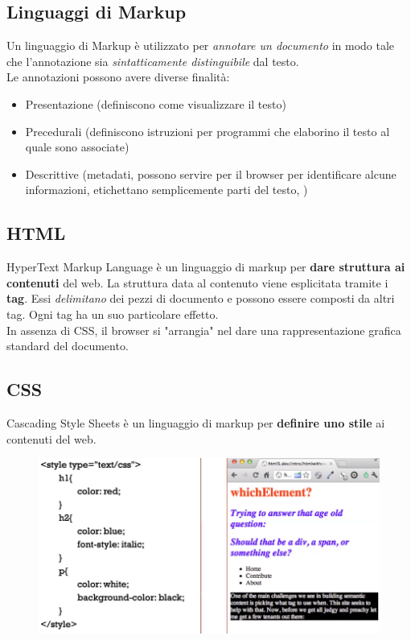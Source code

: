 \documentclass[12pt, a4paper]{article}
\begin{document}
    \subsection{Linguaggi di Markup}
    Un linguaggio di Markup è utilizzato per \textit{annotare un documento} in modo 
    tale che l'annotazione sia \textit{sintatticamente distinguibile} dal testo.
    \\Le annotazioni possono avere diverse finalità:
    \begin{itemize}
        \item Presentazione (definiscono come visualizzare il testo)
        \item Precedurali (definiscono istruzioni per programmi che elaborino il testo al quale sono associate)
        \item Descrittive (metadati, possono servire per il browser per identificare alcune informazioni, etichettano semplicemente parti del testo, )
    \end{itemize}


    \subsection{HTML}
    HyperText Markup Language è un linguaggio di markup per \textbf{dare struttura ai contenuti} del web.
    La struttura data al contenuto viene esplicitata tramite i \textbf{tag}. Essi \textit{delimitano}
    dei pezzi di documento e possono essere composti da altri tag. Ogni tag ha un suo particolare effetto.
    \\In assenza di CSS, il browser si "arrangia" nel dare una rappresentazione grafica standard del documento.

    \subsection{CSS}
    Cascading Style Sheets è un linguaggio di markup per \textbf{definire uno stile} ai contenuti del web.
    \begin{figure}[htbp]
        \centering
        \includegraphics[scale=0.5]{css.png}
    \end{figure}
\end{document}
